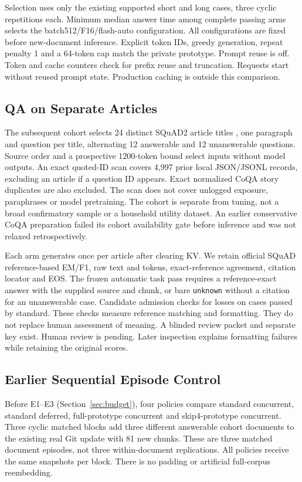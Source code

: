 Selection uses only the existing supported short and long cases, three cyclic
repetitions each. Minimum median answer time among complete passing arms
selects the batch512/F16/flash-auto configuration. All configurations are fixed
before new-document inference. Explicit token IDs, greedy generation, repeat
penalty 1 and a 64-token cap match the private prototype. Prompt reuse is off.
Token and cache counters check for prefix reuse and truncation.
Requests start without reused prompt state. Production caching is outside
this comparison.

\subsection{QA on Separate Articles}
The subsequent cohort selects 24 distinct SQuAD2 article titles
\citep{squad2}, one paragraph and question per title, alternating 12 answerable and
12 unanswerable questions. Source order and a prospective 1200-token bound
select inputs without model outputs. An exact quoted-ID scan covers 4,997
prior local JSON/JSONL records, excluding an article if a question ID appears.
Exact normalized CoQA story duplicates are also excluded. The scan does not cover unlogged exposure, paraphrases or model pretraining. The
cohort is separate from tuning, not a broad confirmatory sample or a household
utility dataset. An earlier conservative CoQA preparation failed its cohort
availability gate before inference and was not relaxed retrospectively.

Each arm generates once per article after clearing KV. We retain official
SQuAD reference-based EM/F1, raw text and tokens, exact-reference agreement, citation
locator and EOS. The frozen automatic task pass requires a reference-exact
answer with the supplied source and chunk, or bare \texttt{unknown} without a
citation for an unanswerable case. Candidate admission checks for losses on
cases passed by standard. These checks measure reference matching and formatting. They do not replace
human assessment of meaning. A blinded review packet and separate key exist. Human review is pending.
Later inspection explains formatting failures while retaining the original scores.



\subsection{Earlier Sequential Episode Control}
Before E1--E3 (Section~\ref{sec:budget}), four policies compare standard concurrent, standard deferred, full-prototype
concurrent and skip4-prototype concurrent. Three cyclic matched blocks add
three different answerable cohort documents to the existing real Git update
with 81 new chunks. These are three matched document episodes, not three
within-document replications. All policies receive the same snapshots per block.
There is no padding or artificial full-corpus reembedding.


